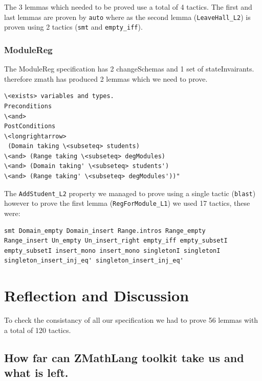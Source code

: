 The 3 lemmas which needed to be proved use a total of 4 tactics. The first and last lemmas are proven by \verb|auto| where as the second lemma (\verb|LeaveHall_L2|) is proven using 2 tactics (\verb|smt| and \verb|empty_iff|).

\subsubsection{ModuleReg}

The ModuleReg specification has 2 changeSchemas and 1 set of stateInvairants. therefore \gls{zmath} has produced 2 lemmas which we need to prove.

\begin{verbatim}
\<exists> variables and types.
Preconditions
\<and>
PostConditions
\<longrightarrow>
 (Domain taking \<subseteq> students)
\<and> (Range taking \<subseteq> degModules)
\<and> (Domain taking' \<subseteq> students')
\<and> (Range taking' \<subseteq> degModules'))"
\end{verbatim}

The \verb|AddStudent_L2| property we managed to prove using a single tactic (\verb|blast|) however to prove the first lemma (\verb|RegForModule_L1|) we used 17 tactics, these were:

\begin{verbatim}
smt Domain_empty Domain_insert Range.intros Range_empty 
Range_insert Un_empty Un_insert_right empty_iff empty_subsetI 
empty_subsetI insert_mono insert_mono singletonI singletonI 
singleton_insert_inj_eq' singleton_insert_inj_eq'
\end{verbatim}

\section{Reflection and Discussion}

To check the consistancy of all our specification we had to prove 56 lemmas with a total of 120 tactics.




\subsection{How far can ZMathLang toolkit take us and what is left.}


